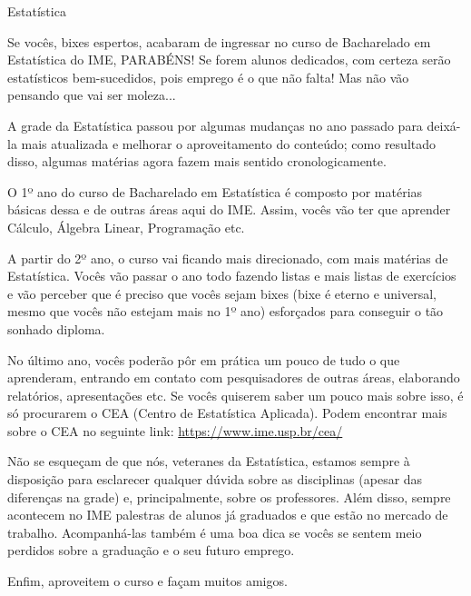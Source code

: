 \begin{subsecao}{Estatística}

Se vocês, bixes espertos, acabaram de ingressar no curso de Bacharelado em
Estatística do IME, PARABÉNS! Se forem alunos dedicados, com certeza serão
estatísticos bem-sucedidos, pois emprego é o que não falta! Mas não vão
pensando que vai ser moleza...

A grade da Estatística passou por algumas mudanças no ano passado 
para deixá-la mais atualizada e melhorar o aproveitamento do conteúdo;
como resultado disso, algumas matérias agora fazem mais sentido cronologicamente.

O 1º ano do curso de Bacharelado em Estatística é composto por matérias básicas
dessa e de outras áreas aqui do IME. Assim, vocês vão ter que aprender Cálculo,
Álgebra Linear, Programação etc.

A partir do 2º ano, o curso vai ficando mais direcionado, com mais matérias de
Estatística. Vocês vão passar o ano todo fazendo listas e mais listas de
exercícios e vão perceber que é preciso que vocês sejam bixes (bixe é eterno e
universal, mesmo que vocês não estejam mais no 1º ano) esforçados para conseguir o tão
sonhado diploma.

No último ano, vocês poderão pôr em prática um pouco de tudo o que
aprenderam, entrando em contato com pesquisadores de outras áreas, elaborando
relatórios, apresentações etc. Se vocês quiserem saber um pouco mais sobre
isso, é só procurarem o CEA (Centro de Estatística Aplicada). Podem encontrar
mais sobre o CEA no seguinte link: \url{https://www.ime.usp.br/cea/}

Não se esqueçam de que nós, veteranes da Estatística, estamos sempre à
disposição para esclarecer qualquer dúvida sobre as disciplinas (apesar %
das diferenças na grade) e, principalmente, sobre os professores. Além disso,
sempre acontecem no IME palestras de alunos já graduados e que estão no
mercado de trabalho. Acompanhá-las também é uma boa dica se vocês se sentem meio
perdidos sobre a graduação e o seu futuro emprego.

Enfim, aproveitem o curso e façam muitos amigos.

\end{subsecao}

